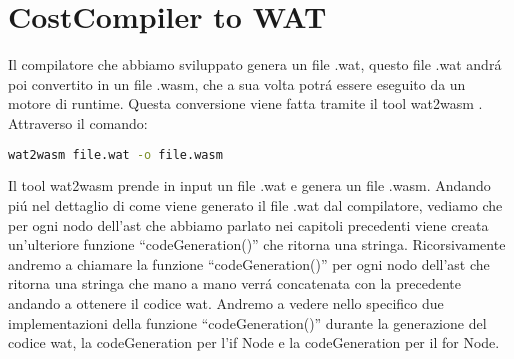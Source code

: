 \documentclass[../../main.tex]{subfiles}
\begin{document}
\section{CostCompiler to WAT}
Il compilatore che abbiamo sviluppato genera un file .wat, questo file .wat andrá poi convertito in un file .wasm, che a sua volta potrá essere eseguito da un motore di runtime.
Questa conversione viene fatta tramite il tool wat2wasm \cite{jain2022webassembly}.
Attraverso il comando:
\begin{lstlisting}[language=bash]
    wat2wasm file.wat -o file.wasm
\end{lstlisting}
Il tool wat2wasm prende in input un file .wat e genera un file .wasm.
Andando piú nel dettaglio di come viene generato il file .wat dal compilatore, vediamo che per ogni nodo dell'ast che abbiamo parlato nei capitoli precedenti viene creata un'ulteriore funzione ``codeGeneration()'' che ritorna una stringa.
Ricorsivamente andremo a chiamare la funzione ``codeGeneration()'' per ogni nodo dell'ast che ritorna una stringa che mano a mano verrá concatenata con la precedente andando a ottenere il codice wat.
Andremo a vedere nello specifico due implementazioni della funzione ``codeGeneration()'' durante la generazione del codice wat, la codeGeneration per l'if Node e la codeGeneration per il for Node.
\end{document}
